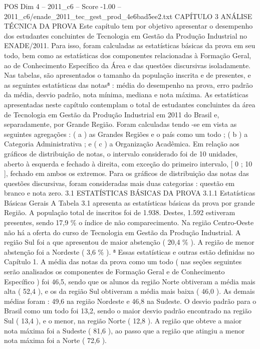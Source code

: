 \begin{textsample}{POS Dim 4 – 2011\_c6 – Score -1.00 – 2011\_c6/enade\_2011\_tec\_gest\_prod\_4e6bad5ee2.txt}  \label{ex:f4_pos_302}
CAPÍTULO 3 ANÁLISE TÉCNICA DA PROVA Este capítulo tem por objetivo apresentar o desempenho dos estudantes concluintes de Tecnologia em Gestão da Produção Industrial no ENADE/2011.
Para isso, foram calculadas as estatísticas básicas da prova em seu todo, bem como as estatísticas dos componentes relacionadas à Formação Geral, ao de Conhecimento Específico da Área e das questões discursivas isoladamente.
Nas tabelas, são apresentados o tamanho da população inscrita e de presentes, e as seguintes estatísticas das notas⁸ : média do desempenho na prova, erro padrão da média, desvio padrão, nota mínima, mediana e nota máxima.
As estatísticas apresentadas neste capítulo contemplam o total de estudantes concluintes da área de Tecnologia em Gestão da Produção Industrial em 2011 do Brasil e, separadamente, por Grande Região.
Foram calculadas tendo -se em vista as seguintes agregações : ( a ) as Grandes Regiões e o país como um todo ; ( b ) a Categoria Administrativa ; e ( c ) a Organização Acadêmica.
Em relação aos gráficos de distribuição de notas, o intervalo considerado foi de 10 unidades, aberto à esquerda e fechado à direita, com exceção do primeiro intervalo, [ 0 ; 10 ], fechado em ambos os extremos.
Para os gráficos de distribuição das notas das questões discursivas, foram consideradas mais duas categorias : questão em branco e nota zero. 3.1 ESTATÍSTICAS BÁSICAS DA PROVA 3.1.1 Estatísticas Básicas Gerais A Tabela 3.1 apresenta as estatísticas básicas da prova por grande Região.
A população total de inscritos foi de 1.938.
Destes, 1.592 estiveram presentes, sendo 17,9 \% o índice de não comparecimento.
Na região Centro-Oeste não há a oferta do curso de Tecnologia em Gestão da Produção Industrial.
A região Sul foi a que apresentou de maior abstenção ( 20,4 \% ).
A região de menor abstenção foi a Nordeste ( 3,6 \% ). ⁸ Essas estatísticas e outras estão definidas no Capítulo 1.
A média das notas da prova como um todo ( nas seções seguintes serão analisados os componentes de Formação Geral e de Conhecimento Específico ) foi 46,5, sendo que os alunos da região Norte obtiveram a média mais alta ( 52,4 ), e os da região Sul obtiveram a média mais baixa ( 46,0 ).
As demais médias foram : 49,6 na região Nordeste e 46,8 na Sudeste.
O desvio padrão para o Brasil como um todo foi 13,2, sendo o maior desvio padrão encontrado na região Sul ( 13,4 ), e o menor, na região Norte ( 12,8 ).
A região que obteve a maior nota máxima foi a Sudeste ( 81,6 ), ao passo que a região que atingiu a menor nota máxima foi a Norte ( 72,6 ).

\end{textsample}
